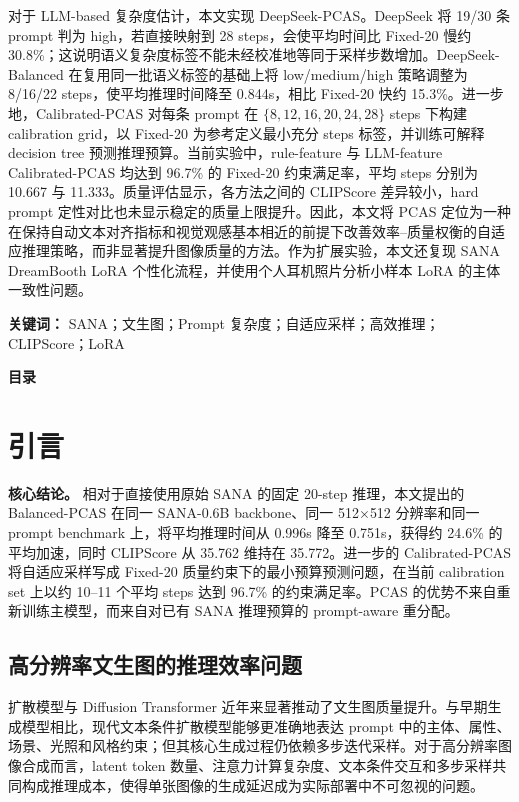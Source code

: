 \documentclass[UTF8,zihao=-4,fontset=fandol]{ctexart}
\makeatletter
\newcommand{\clipscore}{\textrm{CLIPScore}}
\newcommand{\customtableofcontents}{%
  \begin{center}
    {\zihao{2}\bfseries 目录}
  \end{center}
  \vspace{1.4em}
  \@starttoc{toc}%
}
\makeatother
\begin{document}
对于 LLM-based 复杂度估计，本文实现 DeepSeek-PCAS。DeepSeek 将 19/30 条 prompt 判为 high，若直接映射到 28 steps，会使平均时间比 Fixed-20 慢约 30.8\%；这说明语义复杂度标签不能未经校准地等同于采样步数增加。DeepSeek-Balanced 在复用同一批语义标签的基础上将 low/medium/high 策略调整为 8/16/22 steps，使平均推理时间降至 0.844s，相比 Fixed-20 快约 15.3\%。进一步地，Calibrated-PCAS 对每条 prompt 在 $\{8,12,16,20,24,28\}$ steps 下构建 calibration grid，以 Fixed-20 为参考定义最小充分 steps 标签，并训练可解释 decision tree 预测推理预算。当前实验中，rule-feature 与 LLM-feature Calibrated-PCAS 均达到 96.7\% 的 Fixed-20 约束满足率，平均 steps 分别为 10.667 与 11.333。质量评估显示，各方法之间的 \clipscore{} 差异较小，hard prompt 定性对比也未显示稳定的质量上限提升。因此，本文将 PCAS 定位为一种在保持自动文本对齐指标和视觉观感基本相近的前提下改善效率--质量权衡的自适应推理策略，而非显著提升图像质量的方法。作为扩展实验，本文还复现 SANA DreamBooth LoRA 个性化流程，并使用个人耳机照片分析小样本 LoRA 的主体一致性问题。

\noindent\textbf{关键词：} SANA；文生图；Prompt 复杂度；自适应采样；高效推理；CLIPScore；LoRA

\clearpage
\customtableofcontents
\clearpage
\pagestyle{fancy}
\setcounter{page}{1}

\section{引言}

\begin{takeawaybox}
\textbf{核心结论。} 相对于直接使用原始 SANA 的固定 20-step 推理，本文提出的 Balanced-PCAS 在同一 SANA-0.6B backbone、同一 512$\times$512 分辨率和同一 prompt benchmark 上，将平均推理时间从 0.996s 降至 0.751s，获得约 24.6\% 的平均加速，同时 \clipscore{} 从 35.762 维持在 35.772。进一步的 Calibrated-PCAS 将自适应采样写成 Fixed-20 质量约束下的最小预算预测问题，在当前 calibration set 上以约 10--11 个平均 steps 达到 96.7\% 的约束满足率。PCAS 的优势不来自重新训练主模型，而来自对已有 SANA 推理预算的 prompt-aware 重分配。
\end{takeawaybox}

\subsection{高分辨率文生图的推理效率问题}

扩散模型与 Diffusion Transformer 近年来显著推动了文生图质量提升。与早期生成模型相比，现代文本条件扩散模型能够更准确地表达 prompt 中的主体、属性、场景、光照和风格约束；但其核心生成过程仍依赖多步迭代采样。对于高分辨率图像合成而言，latent token 数量、注意力计算复杂度、文本条件交互和多步采样共同构成推理成本，使得单张图像的生成延迟成为实际部署中不可忽视的问题。
\end{document}
